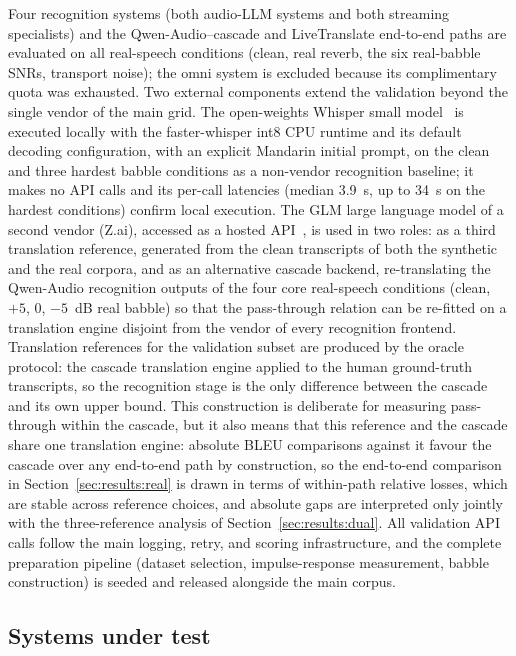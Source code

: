 Four recognition systems (both audio-LLM systems and both streaming
specialists) and the Qwen-Audio--cascade and LiveTranslate end-to-end
paths are evaluated on all real-speech conditions (clean, real reverb, the
six real-babble SNRs, transport noise); the omni system is excluded because
its complimentary quota was exhausted. Two external components extend the
validation beyond the single vendor of the main grid. The open-weights
Whisper small model~\cite{radford2023robust} is executed locally with the
faster-whisper int8 CPU runtime and its default decoding configuration,
with an explicit Mandarin initial prompt, on the clean
and three hardest babble conditions as a non-vendor recognition baseline;
it makes no API calls and its per-call latencies (median 3.9~s, up to 34~s on
the hardest conditions) confirm local execution. The GLM large language
model of a second vendor (Z.ai), accessed as a hosted
API~\cite{glm2026api,glm2025tech}, is used in two roles: as a third
translation
reference, generated from the clean transcripts of both the synthetic and
the real corpora, and as an alternative cascade backend, re-translating the
Qwen-Audio recognition outputs of the four core real-speech conditions
(clean, $+5$, $0$, $-5$~dB real babble) so that the pass-through relation
can be re-fitted on a translation engine disjoint from the vendor of every
recognition frontend. Translation references for the validation subset are
produced by the oracle protocol: the cascade translation engine applied to
the human ground-truth transcripts, so the recognition stage is the only
difference between the cascade and its own upper bound. This construction
is deliberate for measuring pass-through within the cascade, but it also
means that this reference and the cascade share one translation engine:
absolute BLEU comparisons against it favour the cascade over any
end-to-end path by construction, so the end-to-end comparison in
Section~\ref{sec:results:real} is drawn in terms of within-path relative
losses, which are stable across reference choices, and absolute gaps are
interpreted only jointly with the three-reference analysis of
Section~\ref{sec:results:dual}. All validation API calls follow the main
logging, retry, and scoring infrastructure, and the complete preparation
pipeline (dataset selection, impulse-response measurement, babble
construction) is seeded and released alongside the main corpus.

\subsection{Systems under test}

